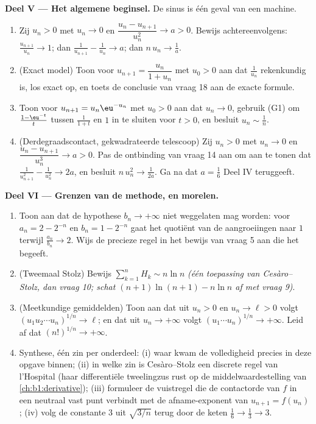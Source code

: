 \begin{problem}[{Weekendopgave --- de stelling van Cesàro--Stolz en de
asymptotiek $u_n \sim \sqrt{3/n}$ voor $u_{n+1} = \sin u_n$}]
\medskip
\noindent\textbf{Deel V --- Het algemene beginsel.} De sinus is één geval
van een machine.
\begin{enumerate}[resume]
  \item Zij $u_n > 0$ met $u_n \to 0$ en $\dfrac{u_n - u_{n+1}}{u_n^{2}}
        \to a > 0$. Bewijs achtereenvolgens: $\frac{u_{n+1}}{u_n} \to
        1$; dan $\frac{1}{u_{n+1}} - \frac{1}{u_n} \to a$; dan $n\,u_n
        \to \frac1a$.
  \item (Exact model) Toon voor $u_{n+1} = \dfrac{u_n}{1 + u_n}$ met
        $u_0 > 0$ aan dat $\frac{1}{u_n}$ rekenkundig is, los exact op,
        en toets de conclusie van vraag 18 aan de exacte formule.
  \item Toon voor $u_{n+1} = u_n \eu^{-u_n}$ met $u_0 > 0$ aan dat $u_n
        \to 0$, gebruik (G1) om $\frac{1 - \eu^{-t}}{t}$ tussen
        $\frac{1}{1+t}$ en $1$ in te sluiten voor $t > 0$, en besluit
        $u_n \sim \frac 1n$.
  \item (Derdegraadscontact, gekwadrateerde telescoop) Zij $u_n > 0$ met
        $u_n \to 0$ en $\dfrac{u_n - u_{n+1}}{u_n^{3}} \to a > 0$. Pas
        de ontbinding van vraag 14 aan om aan te tonen dat
        $\frac{1}{u_{n+1}^2} - \frac{1}{u_n^2} \to 2a$, en besluit
        $n\,u_n^{2} \to \frac{1}{2a}$. Ga na dat $a = \frac16$ Deel IV
        teruggeeft.
\end{enumerate}

\medskip
\noindent\textbf{Deel VI --- Grenzen van de methode, en morelen.}
\begin{enumerate}[resume]
  \item Toon aan dat de hypothese $b_n \to +\infty$ niet weggelaten mag
        worden: voor $a_n = 2 - 2^{-n}$ en $b_n = 1 - 2^{-n}$ gaat het
        quotiënt van de aangroeiingen naar $1$ terwijl $\frac{a_n}{b_n}
        \to 2$. Wijs de precieze regel in het bewijs van vraag 5 aan die
        het begeeft.
  \item (Tweemaal Stolz) Bewijs $\sum_{k=1}^{n} H_k \sim n \ln n$
        \emph{(één toepassing van Cesàro--Stolz, dan vraag 10; schat
        $(n+1)\ln(n+1) - n\ln n$ af met vraag 9)}.
  \item (Meetkundige gemiddelden) Toon aan dat uit $u_n > 0$ en $u_n \to
        \ell > 0$ volgt $(u_1 u_2 \cdots u_n)^{1/n} \to \ell$; en dat
        uit $u_n \to +\infty$ volgt $(u_1 \cdots u_n)^{1/n} \to
        +\infty$. Leid af dat $(n!)^{1/n} \to +\infty$.
  \item Synthese, één zin per onderdeel: (i) waar kwam de volledigheid
        precies in deze opgave binnen; (ii) in welke zin is
        Cesàro--Stolz een discrete regel van l'Hospital (haar
        differentiële tweelingzus rust op de middelwaardestelling van
        \cref{ch:b1:derivative}); (iii) formuleer de vuistregel die de
        contactorde van $f$ in een neutraal vast punt verbindt met de
        afname-exponent van $u_{n+1} = f(u_n)$; (iv) volg de constante
        $3$ uit $\sqrt{3/n}$ terug door de keten $\frac16 \to \frac13
        \to 3$.
\end{enumerate}
\end{problem}
